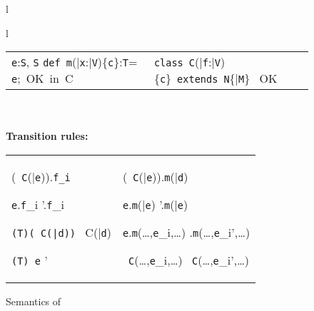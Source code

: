 \begin{figure*}
\begin{tabular}{l}
{\begin{tabular}{l}
\begin{tabular}{p{}p{}}
{	  {\tt e}:{\tt S}, {\tt S} \subtype {\tt T}}
	{{\tt def}\ {\tt m}(\bar{\tt x}:\bar{\tt V})\{{\tt c}\}:{\tt T}= {\tt e};\ \mbox{OK in}\ C}
	&
\infrule[Class OK]
	{\bar{\tt M}\ \mbox{OK in}\ {\tt C}\andalso \this:{\tt C}\vdash {\tt c}:o \andalso \this:{\tt C},{\tt c} \vdash \bar{\tt V}\ \type, {\tt N}\ \type}
	{\mbox{\tt class}\ {\tt C}(\bar{\tt f}:\bar{\tt V})\{{\tt c}\}\ 
	  \mbox{\tt extends}\ {\tt N}\{\bar{\tt M}\} \ \mbox{OK}}
\end{tabular}
\end{tabular}}\\[-12pt]
\quad\\
{\bf Transition rules:}\\[-12pt]
{\tabcolsep=0pt
\begin{tabular}{p{0.43\textwidth}@{\quad}p{0.54\textwidth}}
\typicallabel{RC-Field}
\infrule[\RField]
	{\tt x:C \vdash \fields(\tt x)=\bar{\tt f}:\bar{\tt V}}
	{(\new\ {\tt C}(\bar{\tt e})).{\tt f_i} \derives {\tt e_i}}

\infrule[\RCField]%
	{{\tt e} \derives {{\tt e}}'}
	{{\tt e}.{\tt f}_i \derives {{\tt e}}'.{\tt f}_i}

\infrule[\RCast]%
	{\vdash {\tt C}\{\self==\new\ C(\bar{\tt d})\} \subtype {\tt T}}
	{{\tt (T)(\new\ C(\bar{\tt d}))} \derives \new\ C(\bar{\tt d})}

\infrule[\RCCast]%
	{{\tt e} \derives {{\tt e}}'}
	{{\tt (T) e} \derives {{\tt (T) e}}'}
	&
	\typicallabel{R-Invk-Recv}
	\infrule[\RInvk]
		{{\tt x:C}\vdash {\tt x}\ \has\ {\tt m}(\bar{\tt x}:\bar{\tt T}){\tt \{c\}:T=e}}
		{(\new\ {\tt C}(\bar{\tt e})).{\tt m}(\bar{\tt d}) \derives {\tt e[\new\ {\tt C}(\bar{\tt e}),\bar{\tt d}/\this,\bar{\tt x}]}}

	\infrule[\RCInvkRecv]%
		{{\tt e} \derives {{\tt e}}'}
		{{\tt e}.{\tt m}(\bar{\tt e}) \derives {{\tt e}}'.{\tt m}(\bar{\tt e})}

	\infrule[\RCInvkArg]%
		{{\tt e}_i \derives {{\tt e}_i}'}
		{{\tt e}.{\tt m}(\ldots,{\tt e}_i,\ldots) \derives {{\tt e}}.{\tt m}(\ldots,{\tt e}_i',\ldots)} 

	\infrule[\RCNewArg]%
		{{\tt e}_i \derives {{\tt e}_i}'}
		{\new\ {\tt C}(\ldots,{\tt e}_i,\ldots) \derives \new\ {\tt C}(\ldots,{\tt e}_i',\ldots)}
\end{tabular}
}
\end{tabular}  
 \caption{Semantics of \FX}\label{fig:FX}
\end{figure*}

